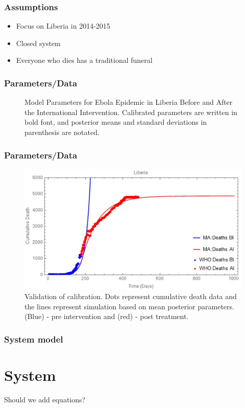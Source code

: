 \documentclass[30pt]{beamer}
\begin{document}
\begin{frame}
\frametitle{Assumptions}
\begin{itemize}
\item Focus on Liberia in 2014-2015
\item Closed system
\item Everyone who dies has a traditional funeral
\end{itemize}
\end{frame}

\begin{frame}
\frametitle{Parameters/Data}
\begin{figure}[!h]
  \centering
  \caption{Model Parameters for Ebola Epidemic in Liberia Before and After the International Intervention. Calibrated parameters are written in bold font, and posterior means and standard deviations in parenthesis are notated. } 
\label{fig:compartment} 
\end{figure}
\end{frame}

\begin{frame}
\frametitle{Parameters/Data}
\begin{figure}[!h]
  \centering
  \includegraphics[width=1\textwidth]{CumulativeDeathMathematica}
  \caption{Validation of calibration. Dots represent cumulative death data and the lines represent simulation
based on mean posterior parameters. (Blue) - pre intervention and (red) - post treatment.} 
\end{figure}
\end{frame}


\begin{frame}
\frametitle{System model}
\section{System}
Should we add equations?
\end{frame}
\end{document}
